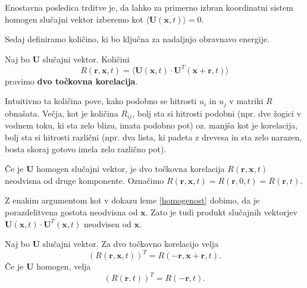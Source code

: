 \documentclass[mat2, tisk]{fmfdelo}
\newcommand{\bd}{\textbf}
\begin{document}
\noindent
Enostavna posledica trditve je, da lahko za primerno izbran koordinatni sistem
homogen slučajni vektor izberemo kot $\langle \bd{U}(\bd{x}, t) \rangle = 0$.

Sedaj definiramo količino, ki bo ključna za nadaljnjo obravnavo 
energije.

\begin{definicija}
Naj bo $\bd{U}$ slučajni vektor. Količini 
\begin{equation*}
R(\bd{r}, \bd{x}, t) = \langle \bd{U}(\bd{x}, t)\cdot \bd{U}^T(\bd{x} + \bd{r}, t)\rangle
\end{equation*}
pravimo \textbf{dvo točkovna korelacija}.
\end{definicija}

Intuitivno ta količina pove, kako podobno se hitrosti $u_i$ in 
$u_j$ v matriki $R$ obnašata. Večja, kot je količina $R_{ij}$, bolj sta si hitrosti 
podobni (npr. dve žogici v vodnem toku, ki sta zelo blizu, imata podobno pot) oz. 
manjša kot je korelacija, bolj sta si hitrosti različni (npr. dva lista, ki padeta 
z drevesa in sta zelo narazen, bosta skoraj gotovo imela zelo različno pot).

\begin{lema}
\label{homogenost2}
Če je $\bd{U}$ homogen slučajni vektor, je
dvo točkovna korelacija $R(\bd{r}, \bd{x}, t)$ neodvisna od druge komponente.
Označimo $R(\bd{r}, \bd{x}, t) = R(\bd{r}, 0, t) = R(\bd{r}, t)$.
\end{lema}

\begin{dokaz}
Z enakim argumentom kot v dokazu leme \ref{homogenost} dobimo, da je 
porazdelitvena gostota neodvisna od $\bd{x}$. Zato je tudi produkt 
slučajnih vektorjev $\bd{U}(\bd{x}, t)\cdot \bd{U}^T(\bd{x}, t)$ neodvisen 
od $\bd{x}$.
\end{dokaz}

\begin{lema}
\label{dvo_točkovna_korelacija}
Naj bo $\bd{U}$ slučajni vektor. Za dvo točkovno korelacijo velja 
\begin{equation*}
(R(\bd{r}, \bd{x}, t))^T = R(-\bd{r}, \bd{x} + \bd{r}, t). 
\end{equation*}
Če je $\bd{U}$ homogen, velja 
\begin{equation}
\label{korr}
(R(\bd{r}, t))^T = R(-\bd{r}, t). 
\end{equation}
\end{lema}
\end{document}
